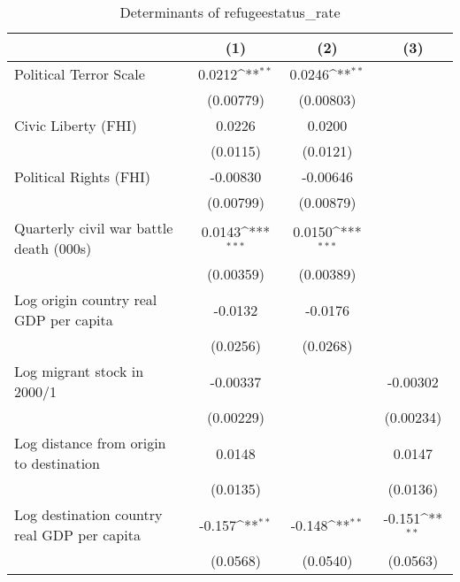 \begin{table}[htbp]\centering
\def\sym#1{\ifmmode^{#1}\else\(^{#1}\)\fi}
\caption{Determinants of refugeestatus\_rate}
\begin{tabular}{l*{3}{c}}
\hline\hline
                    &\multicolumn{1}{c}{(1)}         &\multicolumn{1}{c}{(2)}         &\multicolumn{1}{c}{(3)}         \\
\hline
Political Terror Scale&      0.0212\sym{**} &      0.0246\sym{**} &                     \\
                    &   (0.00779)         &   (0.00803)         &                     \\
[1em]
Civic Liberty (FHI) &      0.0226         &      0.0200         &                     \\
                    &    (0.0115)         &    (0.0121)         &                     \\
[1em]
Political Rights (FHI)&    -0.00830         &    -0.00646         &                     \\
                    &   (0.00799)         &   (0.00879)         &                     \\
[1em]
Quarterly civil war battle death (000s)&      0.0143\sym{***}&      0.0150\sym{***}&                     \\
                    &   (0.00359)         &   (0.00389)         &                     \\
[1em]
Log origin country real GDP per capita&     -0.0132         &     -0.0176         &                     \\
                    &    (0.0256)         &    (0.0268)         &                     \\
[1em]
Log migrant stock in 2000/1&    -0.00337         &                     &    -0.00302         \\
                    &   (0.00229)         &                     &   (0.00234)         \\
[1em]
Log distance from origin to destination&      0.0148         &                     &      0.0147         \\
                    &    (0.0135)         &                     &    (0.0136)         \\
[1em]
Log destination country real GDP per capita&      -0.157\sym{**} &      -0.148\sym{**} &      -0.151\sym{**} \\
                    &    (0.0568)         &    (0.0540)         &    (0.0563)         \\

\end{tabular}
\end{table}
